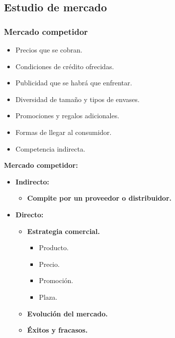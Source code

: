 \documentclass{templateNote}
\begin{document}
\newpage
\subsection*{Estudio de mercado}

\subsubsection*{Mercado competidor}
\begin{itemize}
    \item Precios que se cobran.
    \item Condiciones de crédito ofrecidas.
    \item Publicidad que se habrá que enfrentar.
    \item Diversidad de tamaño y tipos de envases.
    \item Promociones y regalos adicionales.
    \item Formas de llegar al consumidor.
    \item Competencia indirecta.
\end{itemize}

\textbf{Mercado competidor:}
\begin{itemize}
    \item \textbf{Indirecto:}
    \begin{itemize}
        \item \textbf{Compite por un proveedor o distribuidor.}
    \end{itemize}
    \item \textbf{Directo:}
    \begin{itemize}
        \item \textbf{Estrategia comercial.}
        \begin{itemize}
            \item Producto.
            \item Precio.
            \item Promoción.
            \item Plaza.
        \end{itemize}
        \item \textbf{Evolución del mercado.}
        \item \textbf{Éxitos y fracasos.}
    \end{itemize}
\end{itemize}
\end{document}
